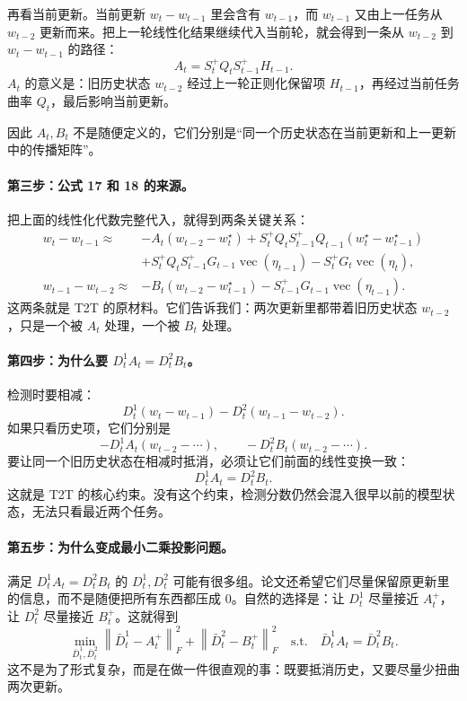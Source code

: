 \documentclass[UTF8,fontset=none,11pt]{ctexart}
\theoremstyle{cnstyle}
\newcommand{\vect}{\operatorname{vec}}
\newcommand{\norm}[1]{\left\lVert #1\right\rVert}
\begin{document}
再看当前更新。当前更新 \(w_t-w_{t-1}\) 里会含有 \(w_{t-1}\)，而 \(w_{t-1}\) 又由上一任务从 \(w_{t-2}\) 更新而来。把上一轮线性化结果继续代入当前轮，就会得到一条从 \(w_{t-2}\) 到 \(w_t-w_{t-1}\) 的路径：
\[
  A_t=S_t^+Q_tS_{t-1}^+H_{t-1}.
\]
\(A_t\) 的意义是：旧历史状态 \(w_{t-2}\) 经过上一轮正则化保留项 \(H_{t-1}\)，再经过当前任务曲率 \(Q_t\)，最后影响当前更新。

因此 \(A_t,B_t\) 不是随便定义的，它们分别是“同一个历史状态在当前更新和上一更新中的传播矩阵”。

\paragraph{第三步：公式 17 和 18 的来源。}
把上面的线性化代数完整代入，就得到两条关键关系：
\begin{align*}
  w_t-w_{t-1}
  \approx&
  -A_t(w_{t-2}-w_t^\star)
  +S_t^+Q_tS_{t-1}^+Q_{t-1}(w_t^\star-w_{t-1}^\star)\\
  &+
  S_t^+Q_tS_{t-1}^+G_{t-1}\vect(\eta_{t-1})
  -S_t^+G_t\vect(\eta_t),
  \\
  w_{t-1}-w_{t-2}
  \approx&
  -B_t(w_{t-2}-w_{t-1}^\star)
  -S_{t-1}^+G_{t-1}\vect(\eta_{t-1}).
\end{align*}
这两条就是 T2T 的原材料。它们告诉我们：两次更新里都带着旧历史状态 \(w_{t-2}\)，只是一个被 \(A_t\) 处理，一个被 \(B_t\) 处理。

\paragraph{第四步：为什么要 \(D_t^1A_t=D_t^2B_t\)。}
检测时要相减：
\[
  D_t^1(w_t-w_{t-1})-D_t^2(w_{t-1}-w_{t-2}).
\]
如果只看历史项，它们分别是
\[
  -D_t^1A_t(w_{t-2}-\cdots),
  \qquad
  -D_t^2B_t(w_{t-2}-\cdots).
\]
要让同一个旧历史状态在相减时抵消，必须让它们前面的线性变换一致：
\[
  D_t^1A_t=D_t^2B_t.
\]
这就是 T2T 的核心约束。没有这个约束，检测分数仍然会混入很早以前的模型状态，无法只看最近两个任务。

\paragraph{第五步：为什么变成最小二乘投影问题。}
满足 \(D_t^1A_t=D_t^2B_t\) 的 \(D_t^1,D_t^2\) 可能有很多组。论文还希望它们尽量保留原更新里的信息，而不是随便把所有东西都压成 0。自然的选择是：让 \(D_t^1\) 尽量接近 \(A_t^+\)，让 \(D_t^2\) 尽量接近 \(B_t^+\)。这就得到
\[
  \min_{\bar D_t^1,\bar D_t^2}
  \norm{\bar D_t^1-A_t^+}_F^2
  +\norm{\bar D_t^2-B_t^+}_F^2
  \quad
  \text{s.t.}\quad
  \bar D_t^1A_t=\bar D_t^2B_t.
\]
这不是为了形式复杂，而是在做一件很直观的事：既要抵消历史，又要尽量少扭曲两次更新。
\end{document}
